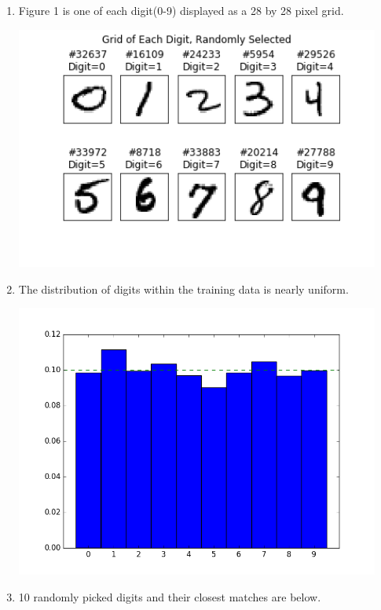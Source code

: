 \documentclass{report}
\begin{document}
\begin{enumerate}
\begin{enumerate}[label=(\alph*)]
		\item Figure 1 is one of each digit(0-9) displayed as a 28 by 28 pixel grid.  
		\begin{center}
		\includegraphics[width=12cm]{one_grid_x_each_digit.png}
		\end{center}
		\item The distribution of digits within the training data is nearly uniform.
		\begin{center}
		\includegraphics[width=12cm]{distrib.png}
		\end{center}
		
		\item 10 randomly picked digits and their closest matches are below.
		

\end{enumerate}
\end{enumerate}
\end{document}
